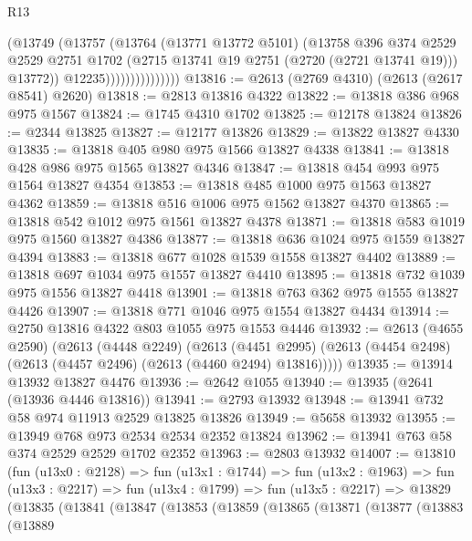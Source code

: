\begin{lexlean}{R13}
\begin{coremodule}
                              (@13749
                                (@13757
                                  (@13764
                                    (@13771 @13772 @5101)
                                    (@13758
                                      @396
                                      @374
                                      @2529
                                      @2529
                                      @2751
                                      @1702
                                      (@2715 @13741 @19 @2751 (@2720 (@2721 @13741 @19)))
                                      @13772))
                                  @12235)))))))))))))))
@13816 := @2613 (@2769 @4310) (@2613 (@2617 @8541) @2620)
@13818 := @2813 @13816 @4322
@13822 := @13818 @386 @968 @975 @1567
@13824 := @1745 @4310 @1702
@13825 := @12178 @13824
@13826 := @2344 @13825
@13827 := @12177 @13826
@13829 := @13822 @13827 @4330
@13835 := @13818 @405 @980 @975 @1566 @13827 @4338
@13841 := @13818 @428 @986 @975 @1565 @13827 @4346
@13847 := @13818 @454 @993 @975 @1564 @13827 @4354
@13853 := @13818 @485 @1000 @975 @1563 @13827 @4362
@13859 := @13818 @516 @1006 @975 @1562 @13827 @4370
@13865 := @13818 @542 @1012 @975 @1561 @13827 @4378
@13871 := @13818 @583 @1019 @975 @1560 @13827 @4386
@13877 := @13818 @636 @1024 @975 @1559 @13827 @4394
@13883 := @13818 @677 @1028 @1539 @1558 @13827 @4402
@13889 := @13818 @697 @1034 @975 @1557 @13827 @4410
@13895 := @13818 @732 @1039 @975 @1556 @13827 @4418
@13901 := @13818 @763 @362 @975 @1555 @13827 @4426
@13907 := @13818 @771 @1046 @975 @1554 @13827 @4434
@13914 := @2750 @13816 @4322 @803 @1055 @975 @1553 @4446
@13932 := @2613
    (@4655 @2590)
    (@2613
      (@4448 @2249)
      (@2613
        (@4451 @2995)
        (@2613 (@4454 @2498) (@2613 (@4457 @2496) (@2613 (@4460 @2494) @13816)))))
@13935 := @13914 @13932 @13827 @4476
@13936 := @2642 @1055
@13940 := @13935 (@2641 (@13936 @4446 @13816))
@13941 := @2793 @13932
@13948 := @13941 @732 @58 @974 @11913 @2529 @13825 @13826
@13949 := @5658 @13932
@13955 := @13949 @768 @973 @2534 @2534 @2352 @13824
@13962 := @13941 @763 @58 @374 @2529 @2529 @1702 @2352
@13963 := @2803 @13932
@14007 := @13810
    (fun (u13x0 : @2128) =>
    fun (u13x1 : @1744) =>
    fun (u13x2 : @1963) =>
    fun (u13x3 : @2217) =>
    fun (u13x4 : @1799) =>
    fun (u13x5 : @2217) =>
    @13829
      (@13835
        (@13841
          (@13847
            (@13853
              (@13859
                (@13865
                  (@13871
                    (@13877
                      (@13883
                        (@13889

\end{coremodule}
\end{lexlean}
